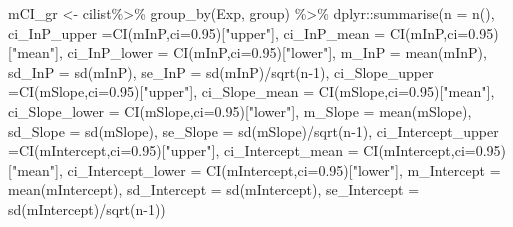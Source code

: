 \documentclass[
]{article}
\newenvironment{Shaded}{\begin{snugshade}}{\end{snugshade}}
\newcommand{\AttributeTok}[1]{\textcolor[rgb]{0.77,0.63,0.00}{#1}}
\newcommand{\DecValTok}[1]{\textcolor[rgb]{0.00,0.00,0.81}{#1}}
\newcommand{\FloatTok}[1]{\textcolor[rgb]{0.00,0.00,0.81}{#1}}
\newcommand{\FunctionTok}[1]{\textcolor[rgb]{0.00,0.00,0.00}{#1}}
\newcommand{\NormalTok}[1]{#1}
\newcommand{\OtherTok}[1]{\textcolor[rgb]{0.56,0.35,0.01}{#1}}
\newcommand{\SpecialCharTok}[1]{\textcolor[rgb]{0.00,0.00,0.00}{#1}}
\newcommand{\StringTok}[1]{\textcolor[rgb]{0.31,0.60,0.02}{#1}}
\begin{document}
\begin{Shaded}
\begin{Highlighting}[]
\NormalTok{mCI\_gr }\OtherTok{\textless{}{-}}\NormalTok{ cilist}\SpecialCharTok{\%\textgreater{}\%} \FunctionTok{group\_by}\NormalTok{(Exp, group) }\SpecialCharTok{\%\textgreater{}\%}
\NormalTok{  dplyr}\SpecialCharTok{::}\FunctionTok{summarise}\NormalTok{(}\AttributeTok{n =} \FunctionTok{n}\NormalTok{(),}
                   \AttributeTok{ci\_InP\_upper =}\FunctionTok{CI}\NormalTok{(mInP,}\AttributeTok{ci=}\FloatTok{0.95}\NormalTok{)[}\StringTok{"upper"}\NormalTok{],}
                   \AttributeTok{ci\_InP\_mean =} \FunctionTok{CI}\NormalTok{(mInP,}\AttributeTok{ci=}\FloatTok{0.95}\NormalTok{)[}\StringTok{"mean"}\NormalTok{],}
                   \AttributeTok{ci\_InP\_lower =} \FunctionTok{CI}\NormalTok{(mInP,}\AttributeTok{ci=}\FloatTok{0.95}\NormalTok{)[}\StringTok{"lower"}\NormalTok{],}
                   \AttributeTok{m\_InP =} \FunctionTok{mean}\NormalTok{(mInP),}
                   \AttributeTok{sd\_InP =} \FunctionTok{sd}\NormalTok{(mInP),}
                   \AttributeTok{se\_InP =} \FunctionTok{sd}\NormalTok{(mInP)}\SpecialCharTok{/}\FunctionTok{sqrt}\NormalTok{(n}\DecValTok{{-}1}\NormalTok{),}
                   \AttributeTok{ci\_Slope\_upper =}\FunctionTok{CI}\NormalTok{(mSlope,}\AttributeTok{ci=}\FloatTok{0.95}\NormalTok{)[}\StringTok{"upper"}\NormalTok{],}
                   \AttributeTok{ci\_Slope\_mean =} \FunctionTok{CI}\NormalTok{(mSlope,}\AttributeTok{ci=}\FloatTok{0.95}\NormalTok{)[}\StringTok{"mean"}\NormalTok{],}
                   \AttributeTok{ci\_Slope\_lower =} \FunctionTok{CI}\NormalTok{(mSlope,}\AttributeTok{ci=}\FloatTok{0.95}\NormalTok{)[}\StringTok{"lower"}\NormalTok{],}
                   \AttributeTok{m\_Slope =} \FunctionTok{mean}\NormalTok{(mSlope),}
                   \AttributeTok{sd\_Slope =} \FunctionTok{sd}\NormalTok{(mSlope),}
                   \AttributeTok{se\_Slope =} \FunctionTok{sd}\NormalTok{(mSlope)}\SpecialCharTok{/}\FunctionTok{sqrt}\NormalTok{(n}\DecValTok{{-}1}\NormalTok{),}
                   \AttributeTok{ci\_Intercept\_upper =}\FunctionTok{CI}\NormalTok{(mIntercept,}\AttributeTok{ci=}\FloatTok{0.95}\NormalTok{)[}\StringTok{"upper"}\NormalTok{],}
                   \AttributeTok{ci\_Intercept\_mean =} \FunctionTok{CI}\NormalTok{(mIntercept,}\AttributeTok{ci=}\FloatTok{0.95}\NormalTok{)[}\StringTok{"mean"}\NormalTok{],}
                   \AttributeTok{ci\_Intercept\_lower =} \FunctionTok{CI}\NormalTok{(mIntercept,}\AttributeTok{ci=}\FloatTok{0.95}\NormalTok{)[}\StringTok{"lower"}\NormalTok{],}
                   \AttributeTok{m\_Intercept =} \FunctionTok{mean}\NormalTok{(mIntercept),}
                   \AttributeTok{sd\_Intercept =} \FunctionTok{sd}\NormalTok{(mIntercept),}
                   \AttributeTok{se\_Intercept =} \FunctionTok{sd}\NormalTok{(mIntercept)}\SpecialCharTok{/}\FunctionTok{sqrt}\NormalTok{(n}\DecValTok{{-}1}\NormalTok{))}
\end{Highlighting}
\end{Shaded}
\end{document}
